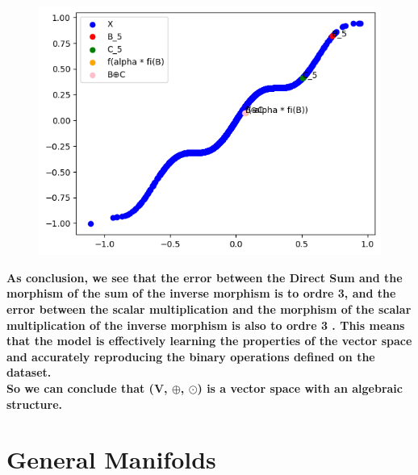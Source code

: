 \documentclass{report}
\begin{document}
            \begin{figure}[h]
                \centering
                \begin{minipage}{0.5\textwidth}
                    \centering
                    \includegraphics[width=0.9\linewidth]{./images/alpha5.png} %
                \end{minipage}%
                \begin{minipage}{0.5\textwidth}
                    \centering
                \end{minipage}
            \end{figure}
        \newpage


        \textbf{As conclusion, we see that the error between the Direct Sum and the morphism of the sum of the inverse morphism is to ordre 3, and the error between the scalar multiplication and the morphism of the scalar multiplication of the inverse morphism is also to ordre 3 . This means that the model is effectively learning the properties of the vector space and accurately reproducing the binary operations defined on the dataset.\\
        So we can conclude that (V, $\oplus$, $\odot$) is a vector space with an algebraic structure.}


\section{General Manifolds}
\end{document}
